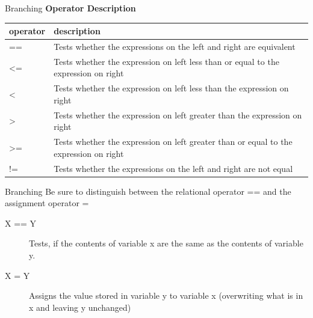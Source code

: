 \documentclass[12pt]{beamer}
\begin{document}
\begin{frame}{Branching}
 \hspace{3cm}\textbf{Operator Description}
 \begin{tabular}{| p{1.8cm} | p{8.2cm} |}
  \hline
  operator & description \\ \hline
  == & Tests whether the expressions on the left and right are equivalent \\ \hline
  <= & Tests whether the expression on left less than or equal to the expression on right \\ \hline
  < & Tests whether the  expression on left less than the expression on right \\ \hline
  > & Tests whether the  expression on left greater than the expression on right \\ \hline
  >= & Tests whether the  expression on left greater than or equal to the expression on right \\ \hline
  != & Tests whether the expressions on the left and right are not equal \\ \hline
 \end{tabular}
\end{frame}

\begin{frame}{Branching}
 Be sure to distinguish between the relational operator == and the assignment operator =
 
 \vspace{1pc}
 \begin{description}
  \item [X == Y] Tests, if the contents of variable x are the same as the contents of variable y.
  \item [X = Y] Assigns the value stored in variable y to variable x (overwriting what is in x and leaving y unchanged)
 \end{description}

\end{frame}
\end{document}
